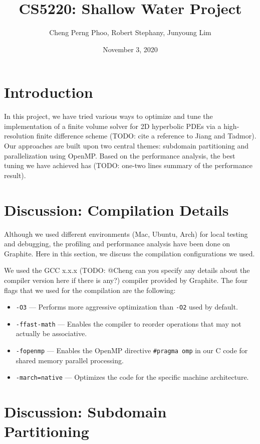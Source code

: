 \documentclass{article}
\title{CS5220: Shallow Water Project}
\author{Cheng Perng Phoo, Robert Stephany, Junyoung Lim}
\date{November 3, 2020}
\begin{document}
\maketitle

\section{Introduction}

In this project, we have tried various ways to optimize and tune the implementation of a finite volume solver for 2D hyperbolic PDEs via a high-resolution finite difference scheme (TODO: cite a reference to Jiang and Tadmor). Our approaches are built upon two central themes: subdomain partitioning and parallelization using OpenMP. Based on the performance analysis, the best tuning we have achieved has (TODO: one-two lines summary of the performance result).

\section{Discussion: Compilation Details}

Although we used different environments (Mac, Ubuntu, Arch) for local testing and debugging, the profiling and performance analysis have been done on Graphite. Here in this section, we discuss the compilation configurations we used.

We used the GCC x.x.x (TODO: @Cheng can you specify any details about the compiler version here if there is any?) compiler provided by Graphite. The four flags that we used for the compilation are the following:
\begin{itemize}
	\item \texttt{-O3} --- Performs more aggressive optimization than \texttt{-O2} used by default.
	\item \texttt{-ffast-math} --- Enables the compiler to reorder operations that may not actually be associative.
	\item \texttt{-fopenmp} --- Enables the OpenMP directive \texttt{\#pragma omp} in our C code for shared memory parallel processing.
	\item \texttt{-march=native} --- Optimizes the code for the specific machine architecture.
\end{itemize}

\section{Discussion: Subdomain Partitioning}
\end{document}
